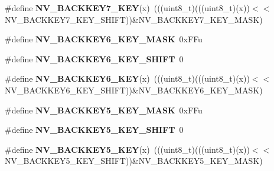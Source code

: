 \begin{DoxyCompactItemize}
\item 
\#define {\bfseries N\+V\+\_\+\+B\+A\+C\+K\+K\+E\+Y7\+\_\+\+K\+EY}(x)~(((uint8\+\_\+t)(((uint8\+\_\+t)(x))$<$$<$N\+V\+\_\+\+B\+A\+C\+K\+K\+E\+Y7\+\_\+\+K\+E\+Y\+\_\+\+S\+H\+I\+FT))\&N\+V\+\_\+\+B\+A\+C\+K\+K\+E\+Y7\+\_\+\+K\+E\+Y\+\_\+\+M\+A\+SK)\hypertarget{group__NV__Register__Masks_ga2dbc4f6480af3ebaeeaf328a7f394c9f}{}\label{group__NV__Register__Masks_ga2dbc4f6480af3ebaeeaf328a7f394c9f}

\item 
\#define {\bfseries N\+V\+\_\+\+B\+A\+C\+K\+K\+E\+Y6\+\_\+\+K\+E\+Y\+\_\+\+M\+A\+SK}~0x\+F\+Fu\hypertarget{group__NV__Register__Masks_ga44e2d846ef1b9d5ad94a707fa6f29ae1}{}\label{group__NV__Register__Masks_ga44e2d846ef1b9d5ad94a707fa6f29ae1}

\item 
\#define {\bfseries N\+V\+\_\+\+B\+A\+C\+K\+K\+E\+Y6\+\_\+\+K\+E\+Y\+\_\+\+S\+H\+I\+FT}~0\hypertarget{group__NV__Register__Masks_ga271a532af55987843f56d660efb5d440}{}\label{group__NV__Register__Masks_ga271a532af55987843f56d660efb5d440}

\item 
\#define {\bfseries N\+V\+\_\+\+B\+A\+C\+K\+K\+E\+Y6\+\_\+\+K\+EY}(x)~(((uint8\+\_\+t)(((uint8\+\_\+t)(x))$<$$<$N\+V\+\_\+\+B\+A\+C\+K\+K\+E\+Y6\+\_\+\+K\+E\+Y\+\_\+\+S\+H\+I\+FT))\&N\+V\+\_\+\+B\+A\+C\+K\+K\+E\+Y6\+\_\+\+K\+E\+Y\+\_\+\+M\+A\+SK)\hypertarget{group__NV__Register__Masks_ga0dc772c12f13eb390c75b52f2110f0f1}{}\label{group__NV__Register__Masks_ga0dc772c12f13eb390c75b52f2110f0f1}

\item 
\#define {\bfseries N\+V\+\_\+\+B\+A\+C\+K\+K\+E\+Y5\+\_\+\+K\+E\+Y\+\_\+\+M\+A\+SK}~0x\+F\+Fu\hypertarget{group__NV__Register__Masks_gab1e58bd037f31bcaa1b96a71340315ba}{}\label{group__NV__Register__Masks_gab1e58bd037f31bcaa1b96a71340315ba}

\item 
\#define {\bfseries N\+V\+\_\+\+B\+A\+C\+K\+K\+E\+Y5\+\_\+\+K\+E\+Y\+\_\+\+S\+H\+I\+FT}~0\hypertarget{group__NV__Register__Masks_ga68762e18611e6dfaed3ddfd7847c09f4}{}\label{group__NV__Register__Masks_ga68762e18611e6dfaed3ddfd7847c09f4}

\item 
\#define {\bfseries N\+V\+\_\+\+B\+A\+C\+K\+K\+E\+Y5\+\_\+\+K\+EY}(x)~(((uint8\+\_\+t)(((uint8\+\_\+t)(x))$<$$<$N\+V\+\_\+\+B\+A\+C\+K\+K\+E\+Y5\+\_\+\+K\+E\+Y\+\_\+\+S\+H\+I\+FT))\&N\+V\+\_\+\+B\+A\+C\+K\+K\+E\+Y5\+\_\+\+K\+E\+Y\+\_\+\+M\+A\+SK)\hypertarget{group__NV__Register__Masks_ga07bc019ba659fc1b38053c8f191371b6}{}\label{group__NV__Register__Masks_ga07bc019ba659fc1b38053c8f191371b6}


\end{DoxyCompactItemize}
